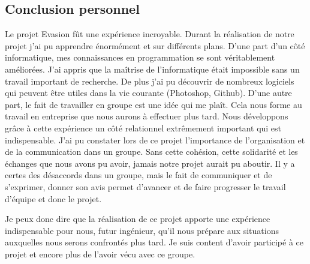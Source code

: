 \documentclass[12pt]{article}
\begin{document}
\subsection{Conclusion personnel}
Le projet Evasion fût une expérience incroyable. Durant la réalisation de notre projet j'ai pu apprendre énormément et sur différents plans. D'une part d'un côté informatique, mes connaissances en programmation se sont véritablement améliorées. J'ai appris que la maîtrise de l'informatique était impossible sans un travail important de recherche. De plus j'ai pu découvrir de nombreux logiciels qui peuvent être utiles dans la vie courante (Photoshop, Github). D'une autre part, le fait de travailler en groupe est une idée qui me plaît. Cela nous forme au travail en entreprise que nous aurons à effectuer plus tard. Nous développons grâce à cette expérience un côté relationnel extrêmement important qui est indispensable. J'ai pu constater lors de ce projet l'importance de l'organisation et de la communication dans un groupe. Sans cette cohésion, cette solidarité et les échanges que nous avons pu avoir, jamais notre projet aurait pu aboutir. Il y a certes des désaccords dans un groupe, mais le fait de communiquer et de s'exprimer, donner son avis permet d'avancer et de faire progresser le travail d'équipe et donc le projet.

Je peux donc dire que la réalisation de ce projet apporte une expérience indispensable pour nous, futur ingénieur, qu'il nous prépare aux situations auxquelles nous serons confrontés plus tard. Je suis content d'avoir participé à ce projet et encore plus de l'avoir vécu avec ce groupe.






\newpage
\thispagestyle{empty}
\pagestyle{fancyplain} \chead{} 
\listoffigures
\end{document}
